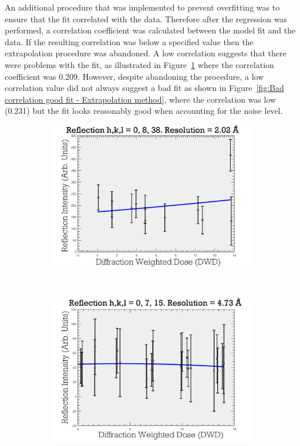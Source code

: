 An additional procedure that was implemented to prevent overfitting was to ensure that the fit correlated with the data.
Therefore after the regression was performed, a correlation coefficient was calculated between the model fit and the data.
If the resulting correlation was below a specified value then the extrapolation procedure was abandoned.
A low correlation suggests that there were problems with the fit, as illustrated in Figure~\ref{fig:Bad correlation bad fit - Extrapolation method} where the correlation coefficient was 0.209.
However, despite abandoning the procedure, a low correlation value did not always suggest a bad fit as shown in Figure~\ref{fig:Bad correlation good fit - Extrapolation method}, where the correlation was low (0.231) but the fit looks reasonably good when accounting for the noise level.
\begin{figure}
        \centering
        \begin{subfigure}[b]{0.9\textwidth}
                \centering
                \includegraphics[width=\textwidth]{figures/zde/ReflectionPlot_h,k,l_0,8,38-bad_corr_bad_fit.pdf}
                \caption{}
                \label{fig:Bad correlation bad fit - Extrapolation method}
        \end{subfigure}
				\\
        \begin{subfigure}[b]{0.9\textwidth}
                \centering
                \includegraphics[width=\textwidth]{figures/zde/ReflectionPlot_h,k,l_0,7,15-bad_corr_good_fit.pdf}

\end{subfigure}
\end{figure}
